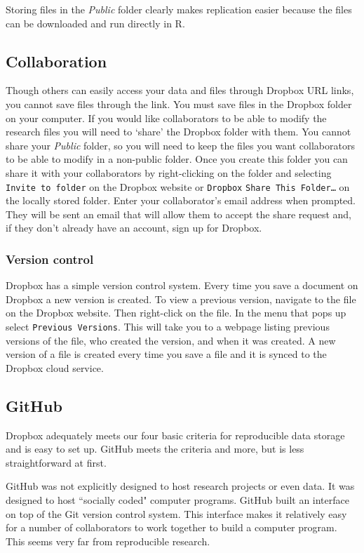 Storing files in the \emph{Public} folder clearly makes replication easier because the files can be downloaded and run directly in R.

\subsection{Collaboration}

Though others can easily access your data and files through Dropbox URL links, you cannot save files through the link. You must save files in the Dropbox folder on your computer. If you would like collaborators to be able to modify the research files you will need to `share' the Dropbox folder with them. You cannot share your \emph{Public} folder, so you will need to keep the files you want collaborators to be able to modify in a non-public folder. Once you create this folder you can share it with your collaborators by right-clicking on the folder and selecting \texttt{Invite to folder} on the Dropbox website or \texttt{Dropbox} \textrightarrow \texttt{Share This Folder\ldots} on the locally stored folder. Enter your collaborator's email address when prompted. They will be sent an email that will allow them to accept the share request and, if they don't already have an account, sign up for Dropbox.

\subsubsection{Version control}

Dropbox has a simple version control system. Every time you save a document on Dropbox a new version is created. To view a previous version, navigate to the file on the Dropbox website. Then right-click on the file. In the menu that pops up select \texttt{Previous Versions}. This will take you to a webpage listing previous versions of the file, who created the version, and when it was created. A new version of a file is created every time you save a file and it is synced to the Dropbox cloud service. 

\subsection{GitHub}

Dropbox adequately meets our four basic criteria for reproducible data storage and is easy to set up. GitHub meets the criteria and more, but is less straightforward at first.

GitHub was not explicitly designed to host research projects or even data. It was designed to host ``socially coded" computer programs. GitHub built an interface on top of the Git version control system. This interface makes it relatively easy for a number of collaborators to work together to build a computer program. This seems very far from reproducible research.

